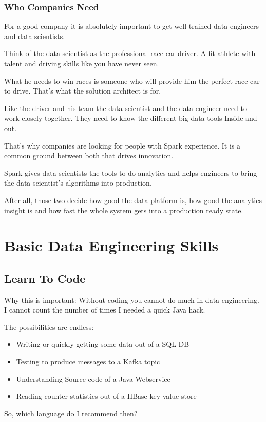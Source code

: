 \documentclass[12pt, numbers=noenddot]{scrreprt} %
\begin{document}
\section{Who Companies Need}
For a good company it is absolutely important to get well trained data engineers and data scientists.

Think of the data scientist as the professional race car driver. A fit athlete with talent and driving skills like you have never seen.

What he needs to win races is someone who will provide him the perfect race car to drive. That’s what the solution architect is for.

Like the driver and his team the data scientist and the data engineer need to work closely together. They need to know the different big data tools Inside and out.

That's why companies are looking for people with Spark experience. It is a common ground between both that drives innovation.

Spark gives data scientists the tools to do analytics and helps engineers to bring the data scientist’s algorithms into production.

After all, those two decide how good the data platform is, how good the analytics insight is and how fast the whole system gets into a production ready state.


\part{Basic Data Engineering Skills}

\chapter{Learn To Code}

Why this is important: Without coding you cannot do much in data engineering. I cannot count the number of times I needed a quick Java hack.

The possibilities are endless:

\begin{itemize}
\item Writing or quickly getting some data out of a SQL DB
\item Testing to produce messages to a Kafka topic
\item Understanding Source code of a Java Webservice
\item Reading counter statistics out of a HBase key value store
\end{itemize}
So, which language do I recommend then?
\end{document}
